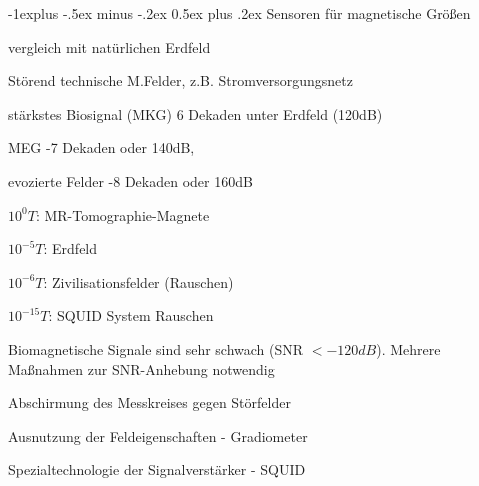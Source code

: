 \documentclass[a4paper]{article}
\makeatletter
\renewcommand{\subsection}{\@startsection{subsection}{2}{0mm}%
 {-1explus -.5ex minus -.2ex}%
 {0.5ex plus .2ex}%
 {\normalfont\normalsize\bfseries}}
\renewcommand{\subsubsection}{\@startsection{subsubsection}{3}{0mm}%
 {-1ex plus -.5ex minus -.2ex}%
 {1ex plus .2ex}%
 {\normalfont\small\bfseries}}
\makeatother
\begin{document}
\begin{multicols}{3}
  \subsection{Sensoren für magnetische Größen}\label{sensoren-fuer-magnetische-groessen}
  \begin{itemize*}
    \item vergleich mit natürlichen Erdfeld
    \item Störend technische M.Felder, z.B. Stromversorgungsnetz
  \end{itemize*}

  \begin{enumerate*}
    \item stärkstes Biosignal (MKG) 6 Dekaden unter Erdfeld (120dB)%
    \item MEG -7 Dekaden oder 140dB,
    \item evozierte Felder -8 Dekaden oder 160dB
  \end{enumerate*}

  \begin{itemize*}
    \item $10^{0}T$: MR-Tomographie-Magnete
    \item $10^{-5}T$: Erdfeld
    \item $10^{-6}T$: Zivilisationsfelder (Rauschen)
    \item $10^{-15}T$: SQUID System Rauschen
  \end{itemize*}

  Biomagnetische Signale sind sehr schwach (SNR $< -120dB$).
  Mehrere Maßnahmen zur SNR-Anhebung notwendig
  \begin{itemize*}
    \item Abschirmung des Messkreises gegen Störfelder
    \item Ausnutzung der Feldeigenschaften - Gradiometer
    \item Spezialtechnologie der Signalverstärker - SQUID
  \end{itemize*}


\end{multicols}
\end{document}
